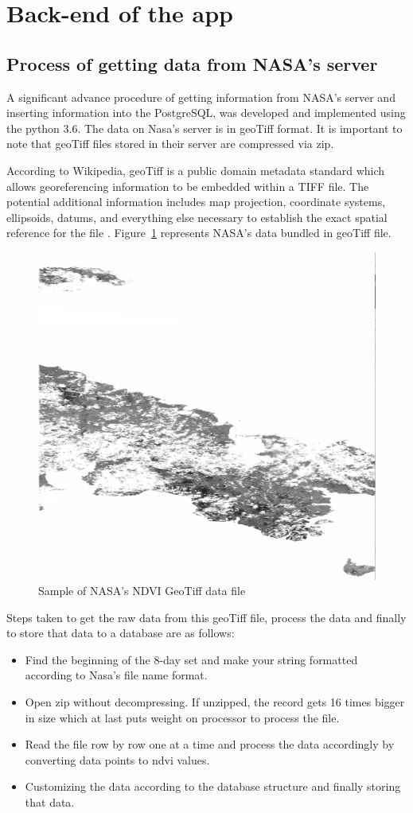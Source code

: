 \section{Back-end of the app}

\subsection{Process of getting data from NASA's server}

A significant advance procedure of getting information from NASA's server and inserting information into the PostgreSQL, was developed and implemented using the python 3.6. The data on Nasa's server is in \gls{geoTiff} format. It is important to note that \gls{geoTiff} files stored in their server are compressed via zip.

According to Wikipedia, \gls{geoTiff} is a public domain metadata standard which allows georeferencing information to be embedded within a TIFF file. The potential additional information includes map projection, coordinate systems, ellipsoids, datums, and everything else necessary to establish the exact spatial reference for the file \cite{GeoTIFF_Wikipedia}. Figure~\ref{fig:geotiff} represents NASA's data bundled in \gls{geoTiff} file.

    \begin{figure}[H]
            \centering
            \includegraphics[width=0.35\linewidth]{figures/ch4/geotiff.png}
            \caption{\label{fig:geotiff} Sample of NASA's NDVI GeoTiff data file}
    \end{figure}

    Steps taken to get the raw data from this \gls{geoTiff} file, process the data and finally to store that data to a database are as follows:
    
    \begin{itemize}
        \item Find the beginning of the 8-day set and make your string formatted according to Nasa's file name format.
        
        \item Open zip without decompressing. If unzipped, the record gets 16 times bigger in size which at last puts weight on processor to process the file.
        
        \item Read the file row by row one at a time and process the data accordingly by converting data points to \gls{ndvi} values.
        
        \item Customizing the data according to the database structure and finally storing that data.
    \end{itemize}

